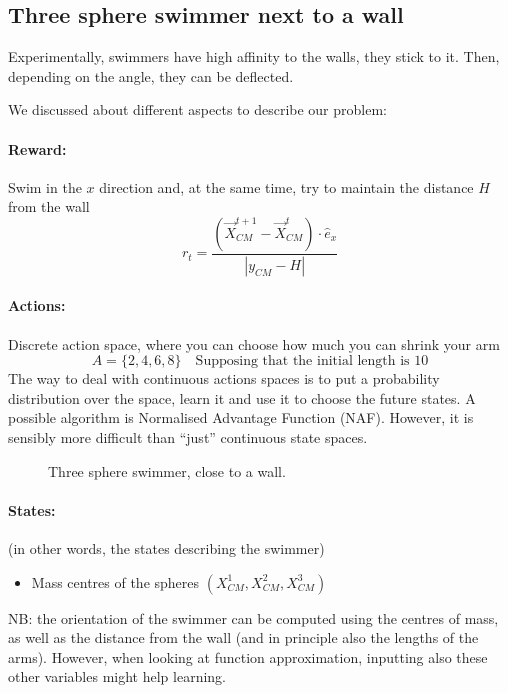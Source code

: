 \documentclass{article}
\begin{document}
\subsection{Three sphere swimmer next to a wall}
Experimentally, swimmers have high affinity to the walls, they stick to it. Then, depending on the angle, they can be deflected.

We discussed about different aspects to describe our problem:

\paragraph{Reward:} Swim in the $x$ direction and, at the same time, try to maintain the distance $H$ from the wall
\[
r_t=\frac{(\vec{X}_{CM}^{t+1}-\vec{X}_{CM}^t)\cdot \hat{e}_x}{|y_{CM}-H|}
\]
\paragraph{Actions:} Discrete action space, where you can choose how much you can shrink your arm
\[
A = \{2,4,6,8\} \quad\text{Supposing that the initial length is 10}
\]
The way to deal with continuous actions spaces is to put a probability distribution over the space, learn it and use it to choose the future states. A possible algorithm is Normalised Advantage Function (NAF). However, it is sensibly more difficult than ``just'' continuous state spaces.
\begin{figure}
	\centering
	\caption{Three sphere swimmer, close to a wall.}
\end{figure}
\paragraph{States:} (in other words, the states describing the swimmer)
\begin{itemize}
	\item Mass centres of the spheres $(X_{CM}^1,X_{CM}^2,X_{CM}^3)$
\end{itemize}
NB: the orientation of the swimmer can be computed using the centres of mass, as well as the distance from the wall (and in principle also the lengths of the arms). However, when looking at function approximation, inputting also these other variables might help learning.
\\
\end{document}
